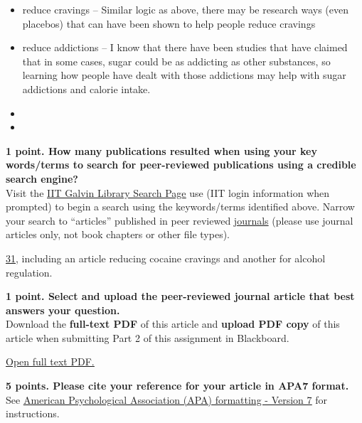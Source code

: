 \documentclass[title={Credible Sources - Literature Review and Article Selection},points={30}]{fdsn201homework}
\let\oldhref\href
\renewcommand{\href}[2]{\oldhref{#1}{\underline{#2}}}
\begin{document}
\begin{problems}
\begin{answer}
\begin{itemize}
			\item reduce cravings -- Similar logic as above, there may be research ways (even placebos) that can have been shown to help people reduce cravings
			\item reduce addictions -- I know that there have been studies that have claimed that in some cases, sugar could be as addicting as other substances, so learning how people have dealt with those addictions may help with sugar addictions and calorie intake.
			\item
			\item
		\end{itemize}
	\end{answer}
	\item \textbf{1 point. How many publications resulted when using your key words/terms to search for peer-reviewed publications using a credible search engine?}\\
	Visit the \href{https://library.iit.edu/}{IIT Galvin Library Search Page} use (IIT login information when prompted) to begin a search using the keywords/terms identified above.
	Narrow your search to ``articles'' published in peer reviewed \underline{journals} (please use journal articles only, not book chapters or other file types).%
	\begin{answer}%
		\href{https://i-share-iit.primo.exlibrisgroup.com/discovery/search?query=any,contains,psychology,AND&query=any,contains,reduce,AND&query=any,contains,cravings,AND&query=any,contains,calorie,AND&tab=CentralIndex&search_scope=CentralIndex&sortby=rank&vid=01CARLI_IIT:CARLI_IIT&lang=en&mode=advanced&offset=0}{31}, including an article reducing cocaine cravings and another for alcohol regulation.
	\end{answer}
	\item \textbf{1 point. Select and upload the peer-reviewed journal article that best answers your question.}\\
	Download the \textbf{full-text PDF} of this article and \textbf{upload PDF copy} of this article when submitting Part 2 of this assignment in Blackboard.%
	\begin{answer}%
		\href{run:Imaginal_retraining_reduces_craving_for_high-calorie_food.pdf}{Open full text PDF.}
	\end{answer}
	\item \textbf{5 points. Please cite your reference for your article in APA7 format.}\\
	See \href{https://apastyle.apa.org/style-grammar-guidelines/references}{American Psychological Association (APA) formatting - Version 7} for instructions.%

\end{problems}
\end{document}
